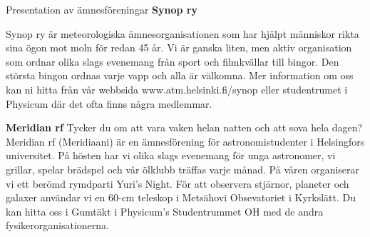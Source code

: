 \documentclass{spektraklet}
\begin{document}
\begin{artikel}{Presentation av ämnesföreningar}{}
\textbf{Synop ry}

Synop ry är meteorologiska ämnesorganisationen som har hjälpt människor rikta sina
ögon mot moln för redan 45 år. Vi är ganska liten, men aktiv organisation som ordnar olika
slags evenemang från sport och filmkvällar till bingor. Den största bingon ordnas varje vapp
och alla är välkomna. Mer information om oss kan ni hitta från vår webbsida www.atm.helsinki.fi/synop eller studentrumet i Physicum där det ofta finns några medlemmar.

\textbf{Meridian rf}
Tycker du om att vara vaken helan natten och att sova hela dagen? Meridian rf
(Meridiaani) är en ämnesförening för astronomistudenter i Helsingfors universitet. På hösten
har vi olika slags evenemang för unga astronomer, vi grillar, spelar brädspel och vår ölklubb träffas varje månad. På våren organiserar vi ett berömd rymdparti Yuri's Night. För att observera stjärnor, planeter och galaxer användar vi en 60-cm teleskop i Metsähovi
Obsevatoriet i Kyrkslätt. Du kan hitta oss i Gumtäkt i Physicum's Studentrummet OH med de
andra fysikerorganisationerna.

\end{artikel}
\end{document}
